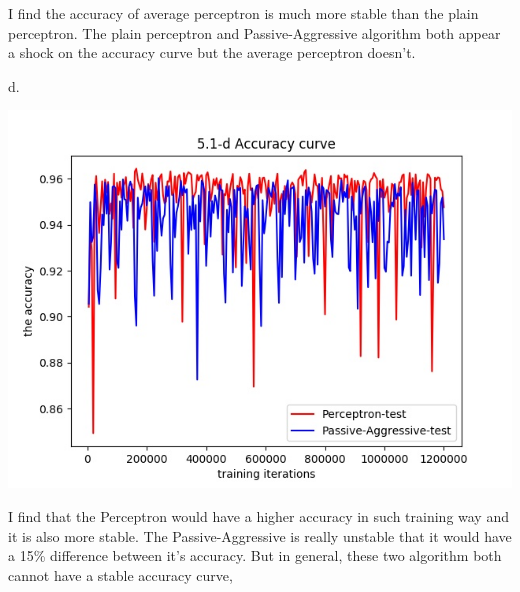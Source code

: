 \documentclass[12pt]{article}
\begin{document}
			\par	  I find the accuracy of average perceptron is much more stable than the plain perceptron. The plain perceptron and Passive-Aggressive algorithm both appear a shock on the accuracy curve but the average perceptron doesn't.
			\par d.	\par\includegraphics[height=10cm] {part1_d}
			\par		I find that the Perceptron would have a higher accuracy in such training way and it is also more stable. The Passive-Aggressive is really unstable that it would have a 15\% difference between it's accuracy. But in general, these two algorithm both cannot have a stable accuracy curve, 
\end{document}
